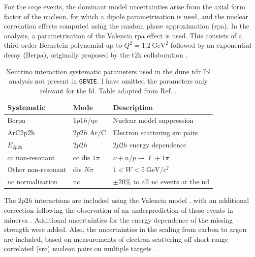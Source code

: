 For the \gls{cc}\gls{qe} events, the dominant model uncertainties arise from the axial form factor of the nucleon, for which a dipole parametrisation is used, and the nuclear correlation effects computed using the random phase approximation (\gls{rpa}). In the analysis, a parametrisation of the Valencia \gls{rpa} effect \cite{Nieves2011} is used. This consists of a third-order Bernstein polynomial up to $Q^{2} = 1.2 ~ \mathrm{GeV}^{2}$ followed by an exponential decay (Be\gls{rpa}), originally proposed by the \gls{t2k} collaboration \cite{T2K2018}.

\begin{table}[t]
	\caption[Neutrino interaction systematic parameters used in the \gls{dune} \gls{tdr} \gls{lbl} analysis not present in \texttt{GENIE}.]{Neutrino interaction systematic parameters used in the \gls{dune} \gls{tdr} \gls{lbl} analysis not present in \texttt{GENIE}. I have omitted the parameters only relevant for the \gls{fd}. Table adapted from Ref. \cite{DUNE2021}.}
	\begin{center}
		\begin{small}
			\begin{tabular}{l|l|l}
                Systematic         & Mode        & Description                         \\[2mm] \hline
                \rule{0pt}{1.1\normalbaselineskip}Be\gls{rpa}              & $1p1h$/\gls{qe}   & Nuclear model suppression           \\[2mm]
                ArC2p2h            & $2p2h$ Ar/C   & Electron scattering \gls{src} pairs       \\[2mm]
                $E_{2p2h}$         & $2p2h$        & $2p2h$ energy dependence            \\[2mm]
                \gls{cc} non-resonant    & \gls{cc} \gls{dis} $1\pi$ & $\nu + n/p \rightarrow \ell + 1\pi$ \\[2mm]
                Other non-resonant & \gls{dis} $N\pi$    & $1 < W < 5 ~ \mathrm{GeV}/c^{2}$    \\[2mm]
                \gls{nc} normalisation   & \gls{nc}            & $\pm 20\%$ to all \gls{nc} events at the \gls{nd}
            \end{tabular}
		\end{small}
	\end{center}
	\label{tab:xsec_non_genie_systs}
\end{table}

The $2p2h$ interactions are included using the Valencia model \cite{Nieves2011}, with an additional correction following the observation of an underprediction of these events in \gls{minerva} \cite{MINERvA2015}. Additional uncertainties for the energy dependence of the missing strength were added. Also, the uncertainties in the scaling from carbon to argon are included, based on measurements of electron scattering off short-range correlated (\gls{src}) nucleon pairs on multiple targets \cite{Colle2015}.


